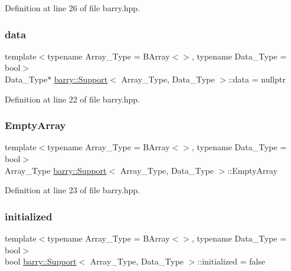 Definition at line 26 of file barry.\+hpp.

\mbox{\label{classbarry_1_1_support_ad53c81c95b0a30ec2cea7e7e88774c0c}} 
\subsubsection{\texorpdfstring{data}{data}}
{\footnotesize\ttfamily template$<$typename Array\+\_\+\+Type  = B\+Array$<$$>$, typename Data\+\_\+\+Type  = bool$>$ \\
Data\+\_\+\+Type$\ast$ \hyperlink{classbarry_1_1_support}{barry\+::\+Support}$<$ Array\+\_\+\+Type, Data\+\_\+\+Type $>$\+::data = nullptr}



Definition at line 22 of file barry.\+hpp.

\mbox{\label{classbarry_1_1_support_ae26e46356041286028ffcc27195b9e8a}} 
\subsubsection{\texorpdfstring{Empty\+Array}{EmptyArray}}
{\footnotesize\ttfamily template$<$typename Array\+\_\+\+Type  = B\+Array$<$$>$, typename Data\+\_\+\+Type  = bool$>$ \\
Array\+\_\+\+Type \hyperlink{classbarry_1_1_support}{barry\+::\+Support}$<$ Array\+\_\+\+Type, Data\+\_\+\+Type $>$\+::Empty\+Array}



Definition at line 23 of file barry.\+hpp.

\mbox{\label{classbarry_1_1_support_a737bc10d6a6e4e3b18aeef0228bd45bb}} 
\subsubsection{\texorpdfstring{initialized}{initialized}}
{\footnotesize\ttfamily template$<$typename Array\+\_\+\+Type  = B\+Array$<$$>$, typename Data\+\_\+\+Type  = bool$>$ \\
bool \hyperlink{classbarry_1_1_support}{barry\+::\+Support}$<$ Array\+\_\+\+Type, Data\+\_\+\+Type $>$\+::initialized = false}



